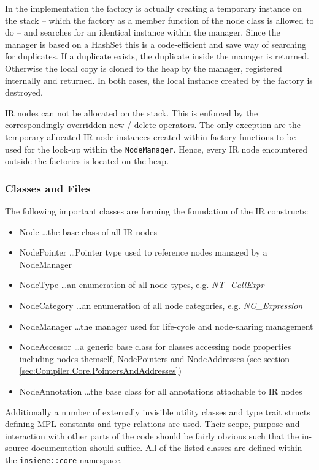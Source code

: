 In the implementation the factory is actually creating a temporary instance on
the stack -- which the factory as a member function of the node class is
allowed to do -- and searches for an identical instance within the manager.
Since the manager is based on a HashSet this is a code-efficient and save way of
searching for duplicates. If a duplicate exists, the duplicate inside the
manager is returned. Otherwise the local copy is cloned to the heap by the
manager, registered internally and returned. In both cases, the local instance
created by the factory is destroyed.

IR nodes can not be allocated on the stack. This is enforced by the
correspondingly overridden new / delete operators. The only exception are the
temporary allocated IR node instances created within factory functions to be
used for the look-up within the \texttt{NodeManager}. Hence, every IR node
encountered outside the factories is located on the heap.


\subsubsection{Classes and Files}
The following important classes are forming the foundation of the IR
constructs:
\begin{itemize}
  \item Node \ldots the base class of all IR nodes
  \item NodePointer \ldots Pointer type used to reference nodes managed by a
  NodeManager
  \item NodeType \ldots an enumeration of all node types, e.g.
  \textit{NT\_CallExpr}
  \item NodeCategory \ldots an enumeration of all node categories, e.g.
  \textit{NC\_Expression}
  \item NodeManager \ldots the manager used for life-cycle and node-sharing
  management
  \item NodeAccessor \dots a generic base class for classes accessing node
  properties including nodes themself, NodePointers and NodeAddresses (see
  section \ref{sec:Compiler.Core.PointersAndAddresses})
  \item NodeAnnotation \dots the base class for all annotations attachable to
  IR nodes
\end{itemize}
Additionally a number of externally invisible utility classes and type trait
structs defining MPL constants and type relations are used. Their scope, purpose
and interaction with other parts of the code should be fairly obvious such
that the in-source documentation should suffice. All of the listed classes are
defined within the \lstinline|insieme::core| namespace.

